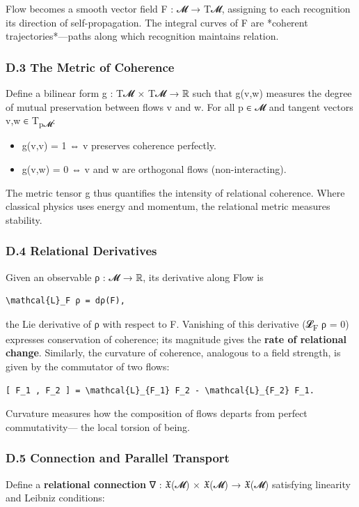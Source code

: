 \documentclass[11pt]{article}
\begin{document}
Flow becomes a smooth vector field F : 𝓜 → T𝓜,  
assigning to each recognition its direction of self-propagation.  
The integral curves of F are *coherent trajectories*—paths along which recognition maintains relation.
\subsubsection*{D.3 The Metric of Coherence}
\label{sec:org92b202f}
Define a bilinear form g : T𝓜 × T𝓜 → ℝ  
such that g(v,w) measures the degree of mutual preservation between flows v and w.  
For all p ∈ 𝓜 and tangent vectors v,w ∈ T\textsubscript{p𝓜}:

\begin{itemize}
\item g(v,v) = 1  ⇔  v preserves coherence perfectly.
\item g(v,w) = 0  ⇔  v and w are orthogonal flows (non-interacting).
\end{itemize}

The metric tensor g thus quantifies the intensity of relational coherence.  
Where classical physics uses energy and momentum, the relational metric measures stability.
\subsubsection*{D.4 Relational Derivatives}
\label{sec:org0a9ce97}
Given an observable ρ : 𝓜 → ℝ, its derivative along Flow is

\begin{verbatim}
\mathcal{L}_F ρ = dρ(F),
\end{verbatim}

the Lie derivative of ρ with respect to F.  
Vanishing of this derivative (𝓛\textsubscript{F} ρ = 0) expresses conservation of coherence;  
its magnitude gives the \textbf{rate of relational change}.  
Similarly, the curvature of coherence, analogous to a field strength,  
is given by the commutator of two flows:

\begin{verbatim}
[ F_1 , F_2 ] = \mathcal{L}_{F_1} F_2 - \mathcal{L}_{F_2} F_1.
\end{verbatim}

Curvature measures how the composition of flows departs from perfect commutativity—  
the local torsion of being.
\subsubsection*{D.5 Connection and Parallel Transport}
\label{sec:orgf77527f}
Define a \textbf{relational connection} ∇ : 𝔛(𝓜) × 𝔛(𝓜) → 𝔛(𝓜)  
satisfying linearity and Leibniz conditions:
\end{document}
